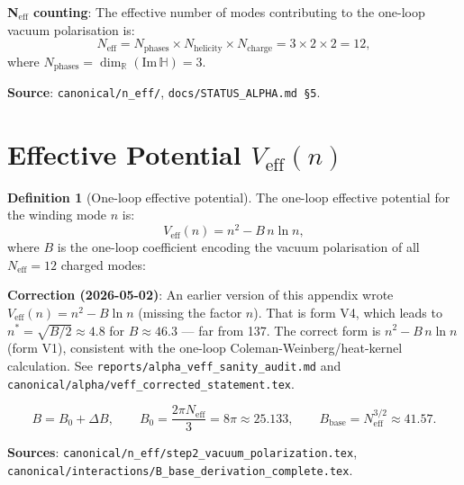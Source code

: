 \documentclass[11pt,a4paper]{article}
\theoremstyle{definition}
\newtheorem{definition}[theorem]{Definition}
\theoremstyle{remark}
\begin{document}
\noindent\textbf{N$_{\mathrm{eff}}$ counting}:
The effective number of modes contributing to the one-loop vacuum polarisation is:
\begin{equation}\label{eq:Neff}
  N_{\mathrm{eff}} = N_{\mathrm{phases}} \times N_{\mathrm{helicity}}
  \times N_{\mathrm{charge}} = 3 \times 2 \times 2 = 12,
\end{equation}
where $N_{\mathrm{phases}} = \dim_\mathbb{R}(\mathrm{Im}\,\mathbb{H}) = 3$.

\noindent\textbf{Source}: \texttt{canonical/n\_eff/},
\texttt{docs/STATUS\_ALPHA.md \S5}.

\section{Effective Potential $V_{\mathrm{eff}}(n)$}\label{sec:Veff}

\begin{definition}[One-loop effective potential]
\label{def:Veff}
The one-loop effective potential for the winding mode $n$ is:
\begin{equation}\label{eq:Veff}
  V_{\mathrm{eff}}(n)
  = n^2 - B\,n\ln n,
\end{equation}
where $B$ is the one-loop coefficient encoding the vacuum polarisation of all
$N_{\mathrm{eff}} = 12$ charged modes:

\begin{warnbox}
\textbf{Correction (2026-05-02)}: An earlier version of this appendix wrote
$V_{\mathrm{eff}}(n) = n^2 - B\ln n$ (missing the factor $n$).
That is form V4, which leads to $n^* = \sqrt{B/2} \approx 4.8$ for
$B \approx 46.3$ — far from 137.
The correct form is $n^2 - B\,n\ln n$ (form V1), consistent with the
one-loop Coleman-Weinberg/heat-kernel calculation.
See \texttt{reports/alpha\_veff\_sanity\_audit.md} and
\texttt{canonical/alpha/veff\_corrected\_statement.tex}.
\end{warnbox}
\begin{equation}\label{eq:B}
  B = B_0 + \Delta B,
  \qquad
  B_0 = \frac{2\pi N_{\mathrm{eff}}}{3} = 8\pi \approx 25.133,
  \qquad
  B_{\mathrm{base}} = N_{\mathrm{eff}}^{3/2} \approx 41.57.
\end{equation}
\end{definition}

\noindent\textbf{Sources}: \texttt{canonical/n\_eff/step2\_vacuum\_polarization.tex},
\texttt{canonical/interactions/B\_base\_derivation\_complete.tex}.
\end{document}
